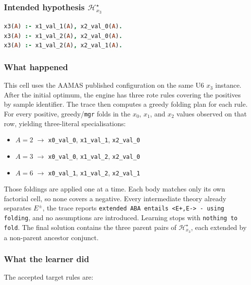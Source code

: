 \documentclass[11pt]{article}
\begin{document}
\subsubsection{\texorpdfstring{Intended hypothesis \(\mathcal{H}_{x_3}^\star\)}{Intended hypothesis H-star(x3)}}

\begin{lstlisting}[style=logic,language=Prolog]
x3(A) :- x1_val_1(A), x2_val_0(A).
x3(A) :- x1_val_2(A), x2_val_0(A).
x3(A) :- x1_val_2(A), x2_val_1(A).
\end{lstlisting}

\subsubsection{What happened}

This cell uses the AAMAS published configuration on the same U6 \(x_3\) instance. After the initial optimum, the engine has three rote rules covering the positives by sample identifier. The trace then computes a greedy folding plan for each rule. For every positive, greedy/\texttt{mgr} folds in the \(x_0\), \(x_1\), and \(x_2\) values observed on that row, yielding three-literal specialisations:

\begin{itemize}
  \item \(A=2\) \(\rightarrow\) \texttt{x0\_val\_0}, \texttt{x1\_val\_1}, \texttt{x2\_val\_0}
  \item \(A=3\) \(\rightarrow\) \texttt{x0\_val\_0}, \texttt{x1\_val\_2}, \texttt{x2\_val\_0}
  \item \(A=6\) \(\rightarrow\) \texttt{x0\_val\_1}, \texttt{x1\_val\_2}, \texttt{x2\_val\_1}
\end{itemize}

Those foldings are applied one at a time. Each body matches only its own factorial cell, so none covers a negative. Every intermediate theory already separates \(E^\pm\), the trace reports \texttt{extended ABA entails <E+,E-> - using folding}, and no assumptions are introduced. Learning stops with \texttt{nothing to fold}. The final solution contains the three parent pairs of \(\mathcal{H}_{x_3}^\star\), each extended by a non-parent ancestor conjunct.

\subsubsection{What the learner did}

The accepted target rules are:
\end{document}
